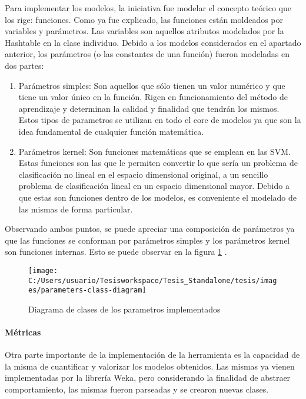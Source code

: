 Para implementar los modelos, la iniciativa fue modelar el concepto
teórico que los rige: funciones. Como ya fue explicado, las funciones
están moldeados por variables y parámetros. Las variables son aquellos
atributos modelados por la Hashtable en la clase individuo. Debido
a los modelos considerados en el apartado anterior, los parámetros
(o las constantes de una función) fueron modeladas en dos partes:
\begin{enumerate}
\item Parámetros simples: Son aquellos que sólo tienen un valor numérico
y que tiene un valor único en la función. Rigen en funcionamiento
del método de aprendizaje y determinan la calidad y finalidad que
tendrán los mismos. Estos tipos de parametros se utilizan en todo
el core de modelos ya que son la idea fundamental de cualquier función
matemática. 
\item Parámetros kernel: Son funciones matemáticas que se emplean en las
\ac{SVM}. Estas funciones son las que le permiten convertir lo que
sería un problema de clasificación no lineal en el espacio dimensional
original, a un sencillo problema de clasificación lineal en un espacio
dimensional mayor. Debido a que estas son funciones dentro de los
modelos, es conveniente el modelado de las mismas de forma particular.
\end{enumerate}
Observando ambos puntos, se puede apreciar una composición de parámetros
ya que las funciones se conforman por parámetros simples y los parámetros
kernel son funciones internas. Esto se puede observar en la figura
\ref{fig:parameters-class-diagram} . 

\begin{figure}
\begin{centering}
\texttt{[image: C:/Users/usuario/Tesisworkspace/Tesis\_Standalone/tesis/images/parameters-class-diagram]}
\par\end{centering}

\caption{Diagrama de clases de los parametros implementados\label{fig:parameters-class-diagram}}
\end{figure}



\paragraph{Métricas}

Otra parte importante de la implementación de la herramienta es la
capacidad de la misma de cuantificar y valorizar los modelos obtenidos.
Las mismas ya vienen implementadas por la librería Weka, pero considerando
la finalidad de abstraer comportamiento, las mismas fueron parseadas
y se crearon nuevas clases.

